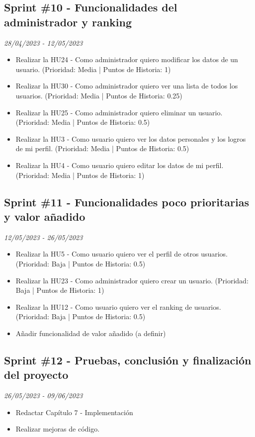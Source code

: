 \subsection{Sprint \#10 - Funcionalidades del administrador y ranking}
\textit{28/04/2023   -   12/05/2023}
\begin{itemize}
\item Realizar la HU24 - Como administrador quiero modificar los datos de un usuario. (Prioridad: Media | Puntos de Historia: 1)
\item Realizar la HU30 - Como administrador quiero ver una lista de todos los usuarios. (Prioridad: Media | Puntos de Historia: 0.25)
\item Realizar la HU25 - Como administrador quiero eliminar un usuario. (Prioridad: Media | Puntos de Historia: 0.5)
\item Realizar la HU3 - Como usuario quiero ver los datos personales y los logros de mi perfil. (Prioridad: Media | Puntos de Historia: 0.5)
\item Realizar la HU4 - Como usuario quiero editar los datos de mi perfil. (Prioridad: Media | Puntos de Historia: 1)

\end{itemize}

\subsection{Sprint \#11 - Funcionalidades poco prioritarias y valor añadido}
\textit{12/05/2023   -   26/05/2023}
\begin{itemize}
    \item Realizar la HU5 - Como usuario quiero ver el perfil de otros usuarios.  (Prioridad: Baja | Puntos de Historia: 0.5)
    \item Realizar la HU23 - Como administrador quiero crear un usuario. (Prioridad: Baja | Puntos de Historia: 1)
    \item Realizar la HU12 - Como usuario quiero ver el ranking de usuarios. (Prioridad: Baja | Puntos de Historia: 0.5)
    \item Añadir funcionalidad de valor añadido (a definir)
    \end{itemize}
    
    \subsection{Sprint \#12 - Pruebas, conclusión y finalización del proyecto}
\textit{26/05/2023   -   09/06/2023}
\begin{itemize}
    \item Redactar Capítulo 7 - Implementación
    \item Realizar mejoras de código.

\end{itemize}
